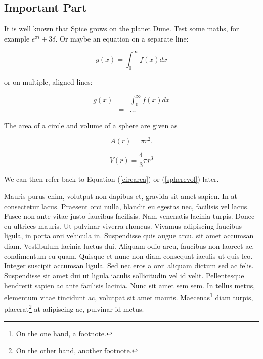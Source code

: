 \subsection{Important Part \label{important-part}}

It is well known \cite{Atr03} that Spice grows on the planet Dune.  Test
some maths, for example $e^{\pi i} + 3 \delta$.  Or maybe an
equation on a separate line:

\begin{equation*}
    g(x) = \int_0^\infty f(x) dx
\end{equation*}

or on multiple, aligned lines:

\begin{eqnarray*}
    g(x) &=& \int_0^\infty f(x) dx \\
        &=& \ldots
\end{eqnarray*}

The area of a circle and volume of a sphere are given as

\begin{equation}
    \label{circarea}
    A(r) = \pi r^2.
\end{equation}

\begin{equation}
    \label{spherevol}
    V(r) = \frac{4}{3} \pi r^3
\end{equation}

We can then refer back to Equation (\ref{circarea}) or
(\ref{spherevol}) later.

Mauris purus enim, volutpat non dapibus et, gravida sit amet sapien. In at
consectetur lacus. Praesent orci nulla, blandit eu egestas nec, facilisis vel
lacus. Fusce non ante vitae justo faucibus facilisis. Nam venenatis lacinia
turpis. Donec eu ultrices mauris. Ut pulvinar viverra rhoncus. Vivamus
adipiscing faucibus ligula, in porta orci vehicula in. Suspendisse quis augue
arcu, sit amet accumsan diam. Vestibulum lacinia luctus dui. Aliquam odio arcu,
faucibus non laoreet ac, condimentum eu quam. Quisque et nunc non diam
consequat iaculis ut quis leo. Integer suscipit accumsan ligula. Sed nec eros a
orci aliquam dictum sed ac felis. Suspendisse sit amet dui ut ligula iaculis
sollicitudin vel id velit. Pellentesque hendrerit sapien ac ante facilisis
lacinia. Nunc sit amet sem sem. In tellus metus, elementum vitae tincidunt ac,
volutpat sit amet mauris. Maecenas\footnote{On the one hand, a footnote.} diam
turpis, placerat\footnote{On the other hand, another footnote.} at adipiscing
ac, pulvinar id metus.

